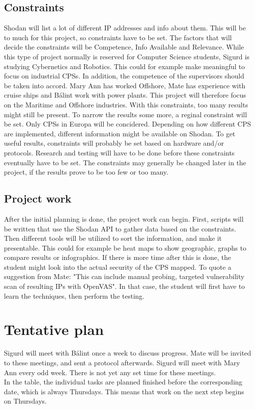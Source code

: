 \subsection{Constraints}\label{sec:constraints}
Shodan will list a lot of different IP addresses and info about them. This will be to much for this project, so constraints have to be set. The factors that will decide the constraints will be Competence, Info Available and Relevance. While this type of project normally is reserved for Computer Science students, Sigurd is studying Cybernetics and Robotics. This could for example make meaningful to focus on industrial CPSs. In addition, the competence of the supervisors should be taken into accord. Mary Ann has worked Offshore, Mate has experience with cruise ships and Bálint work with power plants. This project will therefore focus on the Maritime and Offshore industries. With this constraints, too many results might still be present. To narrow the results some more, a reginal constraint will be set. Only CPSs in Europa will be concidered. Depending on how different CPS are implemented, different information might be available on Shodan. To get useful results, constraints will probably be set based on hardware and/or protocols. Research and testing will have to be done before these constraints eventually have to be set. The constraints may generally be changed later in the project, if the results prove to be too few or too many.

\subsection{Project work}\label{sec:work}
After the initial planning is done, the project work can begin. First, scripts will be written that use the Shodan API to gather data based on the constraints. Then different tools will be utilized to sort the information, and make it presentable. This could for example be heat maps to show geographic, graphs to compare results or infographics. If there is more time after this is done, the student might look into the actual security of the CPS mapped. To quote a suggestion from Mate: "This can include manual probing, targeted vulnerability scan of resulting IPs with OpenVAS". In that case, the student will first have to learn the techniques, then perform the testing.
\newpage

\section{Tentative plan}\label{sec:plan}
 Sigurd will meet with Bálint once a week to discuss progress. Mate will be invited to these meetings, and sent a protocol afterwards. Sigurd will meet with Mary Ann every odd week. There is not yet any set time for these meetings. \\
In the table, the individual tasks are planned finished before the corresponding date, which is always Thursdays. This means that work on the next step begins on Thursdays.
\newline


